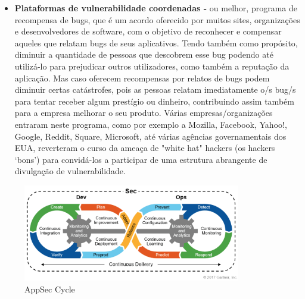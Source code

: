 \documentclass{report}
\begin{document}
\begin{itemize}
   \vspace{5mm} \item   \textbf{Plataformas de vulnerabilidade coordenadas - }ou melhor, programa de recompensa de bugs, que é um acordo oferecido por muitos sites, organizações e desenvolvedores de software, com o objetivo de reconhecer e compensar aqueles que relatam bugs de seus aplicativos. Tendo também como propósito, diminuir a quantidade de pessoas que descobrem esse bug podendo até utilizá-lo para prejudicar outros utilizadores, como também a reputação da aplicação. Mas caso oferecem recompensas por relatos de bugs podem diminuir certas catástrofes, pois as pessoas relatam imediatamente o/s bug/s para tentar receber algum prestígio ou dinheiro, contribuindo assim também para a empresa melhorar o seu produto. Várias empresas/organizações entraram neste programa, como por exemplo a Mozilla, Facebook, Yahoo!, Google, Reddit, Square, Microsoft, até várias agências governamentais dos \ac{EUA}, reverteram o curso da ameaça de "white hat" hackers (os hackers ‘bons’) para convidá-los a participar de uma estrutura abrangente de divulgação de vulnerabilidade. 
\end{itemize}
\begin{figure}[hp]
    \center 
    \includegraphics[height=120pt]{appsec cycle}
    \caption{AppSec Cycle}
    \label{fig:Figura2logo.1}
\end{figure}

\clearpage
\end{document}
